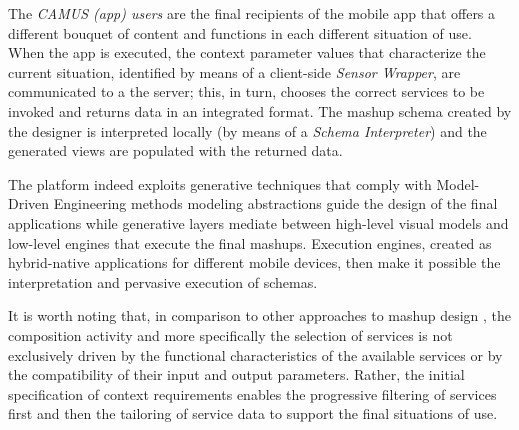 The \emph{CAMUS (app) users} are the final recipients of the mobile
app that offers a different bouquet of content and functions in each
different situation of use. When the app is executed, the context
parameter values that characterize the current situation, identified
by means of a client-side \emph{Sensor Wrapper}, are communicated to a
the server; this, in turn, chooses the correct services to be invoked and returns
data in an integrated format. The mashup schema created by the designer is
interpreted {locally} (by means of a \emph{Schema Interpreter}) and the
generated views are populated with the returned data.

The platform indeed exploits generative techniques that comply with
{Model-Driven Engineering methods} modeling abstractions guide the
design of the final applications while generative layers mediate
between high-level visual models and low-level engines that
execute the final mashups. Execution engines, created as {hybrid-native}
applications for different mobile devices, then make it possible the
interpretation and pervasive execution of schemas.


It is worth noting that, in comparison to other approaches to mashup
design \cite{DBLP:books/sp/DanielM14}, the composition activity and
more specifically the selection of services is not exclusively driven
by the functional characteristics of the available services or by the
compatibility of their input and output parameters. Rather, the
initial specification of context requirements enables the progressive
filtering of services first and then the tailoring of service data to
support the final situations of use.


